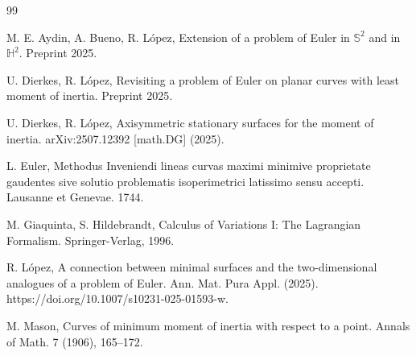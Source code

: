\documentclass[a4paper,12pt]{amsart}
\theoremstyle{definition}
\def\h{\mathbb H}
\def\s{\mathbb S}
\begin{document}
\begin{thebibliography}{99}
 
  M. E. Aydin, A. Bueno, R. L\'opez, Extension of a problem of Euler in $\s^2$ and in $\h^2$. Preprint 2025.
 

 
  U. Dierkes, R. L\'opez, Revisiting a problem of Euler on planar curves with least moment of inertia. Preprint 2025.  

 U. Dierkes, R. L\'opez,   Axisymmetric stationary surfaces for the moment of inertia. arXiv:2507.12392 [math.DG] (2025).

 L. Euler, Methodus Inveniendi lineas curvas maximi minimive proprietate gaudentes sive solutio problematis isoperimetrici latissimo sensu accepti. Lausanne et Genevae. 1744.

 M. Giaquinta, S. Hildebrandt, Calculus of Variations I: The Lagrangian Formalism. Springer-Verlag, 1996.

 R. L\'opez, A connection between minimal surfaces and the two-dimensional analogues of a problem of Euler.	Ann. Mat. Pura Appl.  (2025). https://doi.org/10.1007/s10231-025-01593-w.

 M. Mason, Curves of minimum moment of inertia with respect to a point. Annals of Math. 7 (1906), 165--172. 



 

 
 
 

\end{thebibliography}
\end{document}
